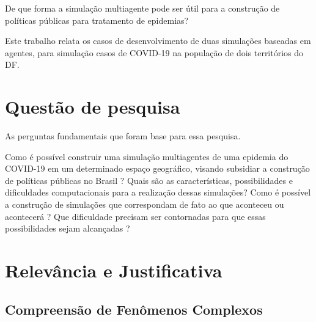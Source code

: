 De que forma a simulação multiagente pode ser útil para a construção de políticas públicas para tratamento de epidemias?


Este trabalho relata os casos de desenvolvimento de duas simulações baseadas em agentes, para simulação casos de COVID-19 na população de dois territórios do DF.

\section{Questão de pesquisa}%
As perguntas fundamentais que foram base para essa pesquisa.

Como é possível construir uma simulação multiagentes de uma epidemia do COVID-19 em um determinado espaço geográfico, visando subsidiar a construção de políticas públicas no Brasil ? Quais são as características, possibilidades e dificuldades computacionais para a realização dessas simulações? Como é possível a construção de simulações que correspondam de fato ao que aconteceu ou acontecerá ? Que dificuldade precisam ser contornadas para que essas possibilidades sejam alcançadas ?


\section{Relevância e Justificativa}%





\subsection{Compreensão de Fenômenos Complexos}

